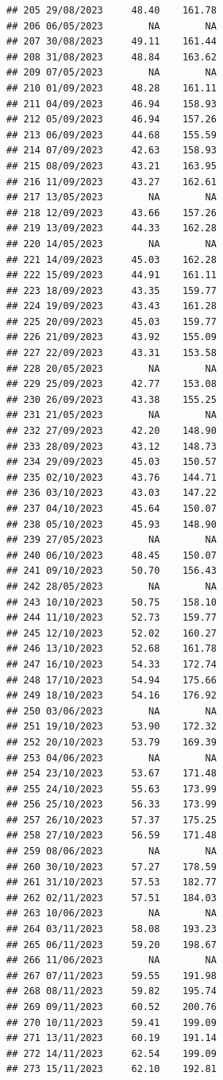 \documentclass[
]{article}
\begin{document}
\begin{verbatim}
## 205 29/08/2023     48.40    161.78
## 206 06/05/2023        NA        NA
## 207 30/08/2023     49.11    161.44
## 208 31/08/2023     48.84    163.62
## 209 07/05/2023        NA        NA
## 210 01/09/2023     48.28    161.11
## 211 04/09/2023     46.94    158.93
## 212 05/09/2023     46.94    157.26
## 213 06/09/2023     44.68    155.59
## 214 07/09/2023     42.63    158.93
## 215 08/09/2023     43.21    163.95
## 216 11/09/2023     43.27    162.61
## 217 13/05/2023        NA        NA
## 218 12/09/2023     43.66    157.26
## 219 13/09/2023     44.33    162.28
## 220 14/05/2023        NA        NA
## 221 14/09/2023     45.03    162.28
## 222 15/09/2023     44.91    161.11
## 223 18/09/2023     43.35    159.77
## 224 19/09/2023     43.43    161.28
## 225 20/09/2023     45.03    159.77
## 226 21/09/2023     43.92    155.09
## 227 22/09/2023     43.31    153.58
## 228 20/05/2023        NA        NA
## 229 25/09/2023     42.77    153.08
## 230 26/09/2023     43.38    155.25
## 231 21/05/2023        NA        NA
## 232 27/09/2023     42.20    148.90
## 233 28/09/2023     43.12    148.73
## 234 29/09/2023     45.03    150.57
## 235 02/10/2023     43.76    144.71
## 236 03/10/2023     43.03    147.22
## 237 04/10/2023     45.64    150.07
## 238 05/10/2023     45.93    148.90
## 239 27/05/2023        NA        NA
## 240 06/10/2023     48.45    150.07
## 241 09/10/2023     50.70    156.43
## 242 28/05/2023        NA        NA
## 243 10/10/2023     50.75    158.10
## 244 11/10/2023     52.73    159.77
## 245 12/10/2023     52.02    160.27
## 246 13/10/2023     52.68    161.78
## 247 16/10/2023     54.33    172.74
## 248 17/10/2023     54.94    175.66
## 249 18/10/2023     54.16    176.92
## 250 03/06/2023        NA        NA
## 251 19/10/2023     53.90    172.32
## 252 20/10/2023     53.79    169.39
## 253 04/06/2023        NA        NA
## 254 23/10/2023     53.67    171.48
## 255 24/10/2023     55.63    173.99
## 256 25/10/2023     56.33    173.99
## 257 26/10/2023     57.37    175.25
## 258 27/10/2023     56.59    171.48
## 259 08/06/2023        NA        NA
## 260 30/10/2023     57.27    178.59
## 261 31/10/2023     57.53    182.77
## 262 02/11/2023     57.51    184.03
## 263 10/06/2023        NA        NA
## 264 03/11/2023     58.08    193.23
## 265 06/11/2023     59.20    198.67
## 266 11/06/2023        NA        NA
## 267 07/11/2023     59.55    191.98
## 268 08/11/2023     59.82    195.74
## 269 09/11/2023     60.52    200.76
## 270 10/11/2023     59.41    199.09
## 271 13/11/2023     60.19    191.14
## 272 14/11/2023     62.54    199.09
## 273 15/11/2023     62.10    192.81

\end{verbatim}
\end{document}
